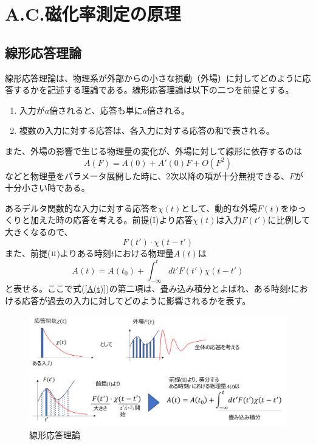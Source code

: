 \documentclass[11pt,a4j]{jreport}
\begin{document}
\chapter{A.C.磁化率測定の原理}
\section{線形応答理論}
線形応答理論は、物理系が外部からの小さな摂動（外場）に対してどのように応答するかを記述する理論である。線形応答理論は以下の二つを前提とする。
\begin{enumerate}[label=\textnormal{(\Roman*)}]
  \item 入力が$a$倍されると、応答も単に$a$倍される。
  \item 複数の入力に対する応答は、各入力に対する応答の和で表される。
\end{enumerate}
また、外場の影響で生じる物理量の変化が、外場に対して線形に依存するのは
\begin{equation}
  A(F)=A(0)+A'(0)F+O(F^2)
\end{equation}
などと物理量をパラメータ展開した時に、2次以降の項が十分無視できる、$F$が十分小さい時である。\par
あるデルタ関数的な入力に対する応答を$\chi(t)$として、動的な外場$F(t)$をゆっくりと加えた時の応答を考える。前提(I)より応答$\chi(t)$は入力$F(t')$に比例して大きくなるので、
\begin{equation}
  F(t')\cdot\chi(t-t')
\end{equation}
また、前提($\textsc{ii}$)よりある時刻$t$における物理量$A(t)$は
\begin{equation}
 A(t)=A(t_0)+\int_{-\infty}^{t}{dt'F(t') \chi(t-t')}
 \label{A(t)}
\end{equation}
と表せる。ここで式(\ref{A(t)})の第二項は、畳み込み積分とよばれ、ある時刻$t$における応答が過去の入力に対してどのように影響されるかを表す。
\begin{figure}[htbp]
  \centering
  \vspace{10mm}
  \includegraphics[width=160mm]{./figure/liner_theory.png}
  \caption{線形応答理論}
  \label{liner_theroy}
\end{figure}
\end{document}
